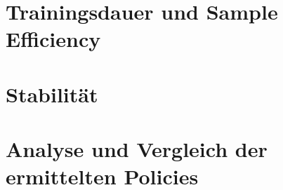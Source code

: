 \section{Trainingsdauer und Sample Efficiency}

\section{Stabilität}

\section{Analyse und Vergleich der ermittelten Policies}
